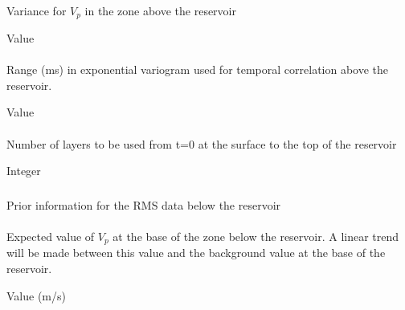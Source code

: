 {\paragraph{}
 \slist
   \item \Description Variance for $V_p$ in the zone above the reservoir
   \item \Argument Value
   \item \Default
 \elist

\paragraph{}
 \slist
   \item \Description Range (ms) in exponential variogram used for temporal correlation above the reservoir.
   \item \Argument Value
   \item \Default
 \elist

\paragraph{}
 \slist
   \item \Description Number of layers to be used from t=0 at the surface to the top of the reservoir
   \item \Argument Integer
   \item \Default
 \elist

\subsubsection{}
 \slist
   \item \Description Prior information for the RMS data below the reservoir
   \item \Argument
   \item \Default
 \elist

\paragraph{}
 \slist
   \item \Description Expected value of $V_p$ at the base of the zone below the reservoir. A linear trend will be made between this value and the background value at the base of the reservoir.
   \item \Argument Value (m/s)
   \item \Default
 \elist

}
